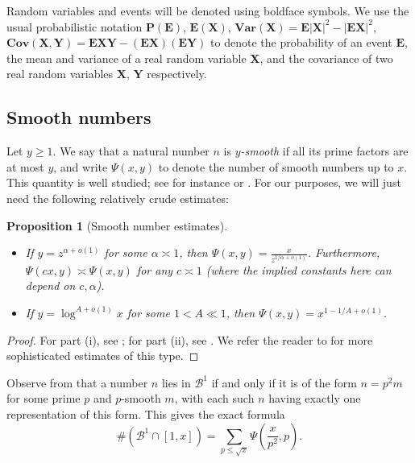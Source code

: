 \documentclass[12pt]{amsart}
\newtheorem{proposition}[theorem]{Proposition}
\newcommand{\E}{\mathbf{E}}
\renewcommand{\P}{\mathbf{P}}
\newcommand{\Var}{\mathbf{Var}}
\newcommand{\Cov}{\mathbf{Cov}}
\begin{document}
Random variables and events will be denoted using boldface symbols.
We use the usual probabilistic notation $\P(\mathbf{E})$, $\E(\mathbf{X})$, $\Var(\mathbf{X}) = \E |\mathbf{X}|^2 - |\E \mathbf{X}|^2$, $\Cov(\mathbf{X},\mathbf{Y}) = \E \mathbf{X} \mathbf{Y} - (\E \mathbf{X}) (\E \mathbf{Y})$ to denote the probability of an event $\mathbf{E}$, the mean and variance of a real random variable $\mathbf{X}$, and the covariance of two real random variables $\mathbf{X}$, $\mathbf{Y}$ respectively.

\subsection{Smooth numbers}

Let $y \geq 1$.  We say that a natural number $n$ is \emph{$y$-smooth} if all its prime factors are at most $y$, and write $\Psi(x,y)$ to denote the number of smooth numbers up to $x$.  This quantity is well studied; see for instance \cite{granville} or \cite{tenenbaum}.  For our purposes, we will just need the following relatively crude estimates:

\begin{proposition}[Smooth number estimates]\label{smoot}\
    \begin{itemize}
        \item[(i)]  If $y = z^{\alpha+o(1)}$ for some $\alpha \asymp 1$, then $\Psi(x,y) = \frac{x}{z^{1/\alpha+o(1)}}$.  Furthermore, $\Psi(cx,y) \asymp \Psi(x,y)$ for any $c \asymp 1$ (where the implied constants here can depend on $c,\alpha$).
        \item[(ii)]  If $y = \log^{A+o(1)} x$ for some $1 < A \ll 1$, then $\Psi(x,y) = x^{1-1/A+o(1)}$.
    \end{itemize}
\end{proposition}

\begin{proof}  For part (i), see \cite[(1.15), (3.24)]{granville}; for part (ii), see \cite[(1.14)]{granville}. We refer the reader to \cite{tenenbaum} for more sophisticated estimates of this type.
\end{proof}

Observe from  that a number $n$ lies in ${\mathcal B}^1$ if and only if it is of the form $n = p^2 m$ for some prime $p$ and $p$-smooth $m$, with each such $n$ having exactly one representation of this form.  This gives the exact formula
\begin{equation}\label{box}
\#({\mathcal B}^1 \cap [1,x])  = \sum_{p \leq \sqrt{x}} \Psi\left(\frac{x}{p^2}, p\right).
\end{equation}
\end{document}
